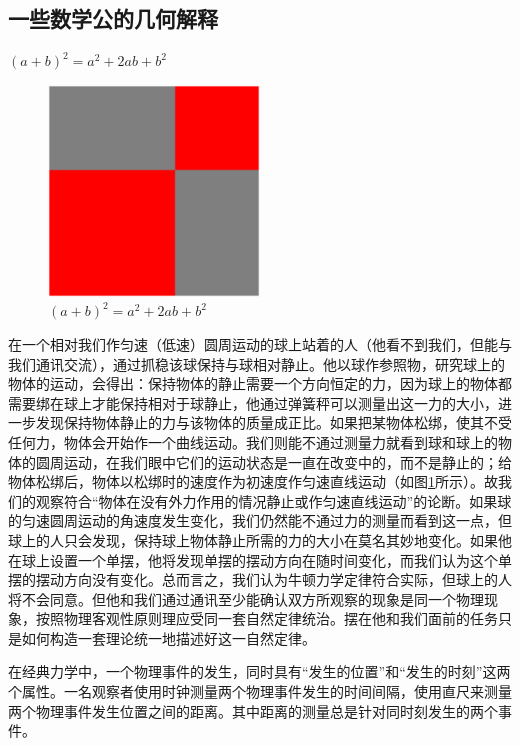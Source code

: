 \documentclass[main.tex]{subfiles}
\begin{document}
\subsection{一些数学公的几何解释}
$(a+b)^2 = a^2 + 2ab + b^2$


\begin{figure}[h]
    \centering
    \includegraphics[width=0.5\textwidth]{images/ps.1.1.eps}
    \caption{$(a+b)^2 = a^2 + 2ab + b^2$}
    \label{fig:III.1.1}
\end{figure}

\begin{example}[“我们” vs “球上的人”]
在一个相对我们作匀速（低速）圆周运动的球上站着的人（他看不到我们，但能与我们通讯交流），通过抓稳该球保持与球相对静止。他以球作参照物，研究球上的物体的运动，会得出：保持物体的静止需要一个方向恒定的力，因为球上的物体都需要绑在球上才能保持相对于球静止，他通过弹簧秤可以测量出这一力的大小，进一步发现保持物体静止的力与该物体的质量成正比。如果把某物体松绑，使其不受任何力，物体会开始作一个曲线运动。我们则能不通过测量力就看到球和球上的物体的圆周运动，在我们眼中它们的运动状态是一直在改变中的，而不是静止的；给物体松绑后，物体以松绑时的速度作为初速度作匀速直线运动（如图\ref{fig:III.1.1}所示）。故我们的观察符合“物体在没有外力作用的情况静止或作匀速直线运动”的论断。如果球的匀速圆周运动的角速度发生变化，我们仍然能不通过力的测量而看到这一点，但球上的人只会发现，保持球上物体静止所需的力的大小在莫名其妙地变化。如果他在球上设置一个单摆，他将发现单摆的摆动方向在随时间变化，而我们认为这个单摆的摆动方向没有变化。总而言之，我们认为牛顿力学定律符合实际，但球上的人将不会同意。但他和我们通过通讯至少能确认双方所观察的现象是同一个物理现象，按照物理客观性原则理应受同一套自然定律统治。摆在他和我们面前的任务只是如何构造一套理论统一地描述好这一自然定律。
\end{example}

在经典力学中，一个物理事件的发生，同时具有“发生的位置”和“发生的时刻”这两个属性。一名观察者使用时钟测量两个物理事件发生的时间间隔，使用直尺来测量两个物理事件发生位置之间的距离。其中距离的测量总是针对同时刻发生的两个事件。
\end{document}
